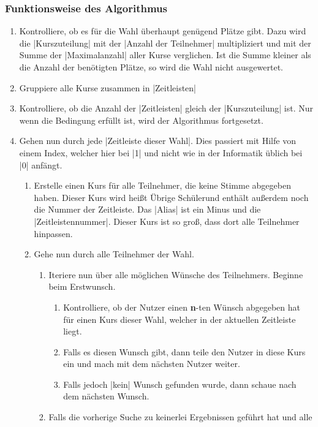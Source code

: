 \documentclass[ngerman]{ltxdoc}
\begin{document}
\subsubsection{Funktionsweise des Algorithmus}

\begin{enumerate}
  \item Kontrolliere, ob es für die Wahl überhaupt genügend Plätze gibt. Dazu
  wird die |Kurszuteilung| mit der |Anzahl der Teilnehmer| multipliziert und mit
  der Summe der |Maximalanzahl| aller Kurse verglichen. Ist die Summe kleiner
  als die Anzahl der benötigten Plätze, so wird die Wahl nicht ausgewertet.
  \item Gruppiere alle Kurse zusammen in |Zeitleisten|
  \item Kontrolliere, ob die Anzahl der |Zeitleisten| gleich der |Kurszuteilung|
  ist. Nur wenn die Bedingung erfüllt ist, wird der Algorithmus fortgesetzt.
  \item Gehen nun durch jede |Zeitleiste dieser Wahl|. Dies passiert mit Hilfe von
  einem Index, welcher hier bei |1| und nicht wie in der Informatik üblich bei |0|
  anfängt.
  \begin{enumerate}
    \item Erstelle einen Kurs für alle Teilnehmer, die keine Stimme abgegeben
    haben. Dieser Kurs wird heißt \glqq Übrige Schüler\grqq und enthält außerdem
    noch die Nummer der Zeitleiste. Das |Alias| ist ein Minus und die |Zeitleistennummer|.
    Dieser Kurs ist so groß, dass dort alle Teilnehmer hinpassen.
    \item Gehe nun durch alle Teilnehmer der Wahl.
    \begin{enumerate}
      \item Iteriere nun über alle möglichen Wünsche des Teilnehmers. Beginne
      beim Erstwunsch.
      \begin{enumerate}
        \item Kontrolliere, ob der Nutzer einen \textbf{n}-ten Wünsch abgegeben hat
        für einen Kurs dieser Wahl, welcher in der aktuellen Zeitleiste liegt.
        \item Falls es diesen Wunsch gibt, dann teile den Nutzer in diese Kurs ein
        und mach mit dem nächsten Nutzer weiter.
        \item Falls jedoch |kein| Wunsch gefunden wurde, dann schaue nach dem nächsten
        Wunsch.
      \end{enumerate}
      \item Falls die vorherige Suche zu keinerlei Ergebnissen geführt hat und alle

\end{enumerate}
\end{enumerate}
\end{enumerate}
\end{document}
